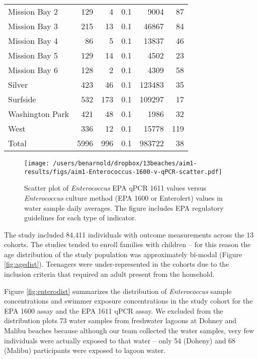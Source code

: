 \documentclass[12pt]{article}\usepackage[]{graphicx}\usepackage[]{color}
\begin{document}
\begin{table}[h!tb]
\begin{center}
\begin{tabular}{l rrrrr}
  Mission Bay 2 & 129 & 4 & 0.1 & 9004 & 87 \\ 
  Mission Bay 3 & 215 & 13 & 0.1 & 46867 & 84 \\ 
  Mission Bay 4 & 86 & 5 & 0.1 & 13837 & 46 \\ 
  Mission Bay 5 & 129 & 14 & 0.1 & 4502 & 23 \\ 
  Mission Bay 6 & 128 & 2 & 0.1 & 4309 & 58 \\ 
  Silver & 423 & 46 & 0.1 & 123483 & 35 \\ 
  Surfside & 532 & 173 & 0.1 & 109297 & 17 \\ 
  Washington Park & 421 & 48 & 0.1 & 1986 & 32 \\ 
  West & 336 & 12 & 0.1 & 15778 & 119 \\ 
  
\hline
 Total & 5996 & 996 & 0.1 & 983722 & 38 \\ 
  
\hline
\end{tabular}
\end{center}
\end{table}



\clearpage
\begin{figure}
\begin{center}
\texttt{[image: /users/benarnold/dropbox/13beaches/aim1-results/figs/aim1-Enterococcus-1600-v-qPCR-scatter.pdf]}
\caption{Scatter plot of \emph{Enterococcus} EPA qPCR 1611 values versus \emph{Enterococcus} culture method (EPA 1600 or Enterolert) values in water sample daily averages. The figure includes EPA regulatory guidelines for each type of indicator.
 \label{fig:entero1600v1611}}
\end{center}
\end{figure}


\clearpage

The study included 84,411 individuals with outcome measurements across the 13 cohorts. The studies tended to enroll families with children  -- for this reason the age distribution of the study population was approximately bi-modal (Figure \ref{fig:agedist}). Teenagers were under-represented in the cohorts due to the inclusion criteria that required an adult present from the household. 

Figure \ref{fig:enterodist} summarizes the distribution of \emph{Enterococcus} sample concentrations and swimmer exposure concentrations in the study cohort for the EPA 1600 assay and the EPA 1611 qPCR assay. We excluded from the distribution plots 73 water samples from freshwater lagoons at Dohney and Malibu beaches because although our team collected the water samples, very few individuals were actually exposed to that water -- only 54 (Doheny) and 68 (Malibu) participants were exposed to lagoon water.
\end{document}
